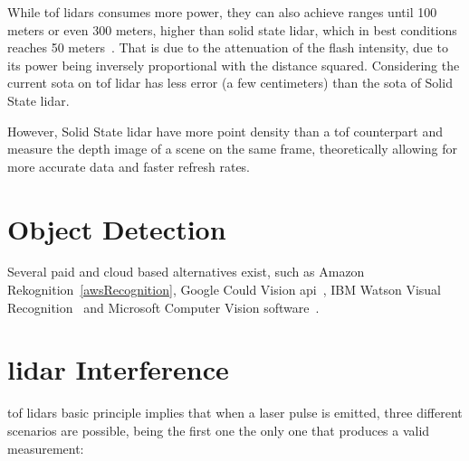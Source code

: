 While \ac{tof} \acp{lidar} consumes more power, they can also achieve ranges until 100 meters \cite{vlp16, Sullivan2016} or even 300 meters\citeneeded, higher than solid state \ac{lidar}, which in best conditions reaches 50 meters~\citeneeded. That is due to the attenuation of the flash intensity, due to its power being inversely proportional with the distance squared\citeneeded. Considering the current \ac{sota} on \ac{tof} \ac{lidar} has less error (a few centimeters) than the \ac{sota} of Solid State \ac{lidar}.

However, Solid State \ac{lidar} have more point density than a \ac{tof} counterpart and measure the depth image of a scene on the same frame, theoretically allowing for more accurate data and faster refresh rates\citeneeded. 





\section{Object Detection}
Several paid and cloud based alternatives exist, such as Amazon Rekognition~\ref{awsRecognition}, Google Could Vision \ac{api}~\cite{googlevision}, IBM Watson Visual Recognition~\cite{watson} and Microsoft Computer Vision software~\cite{azurecv}. 




\section{\ac{lidar} Interference}
\ac{tof} \ac{lidar}s basic principle implies that when a \ac{laser} pulse is emitted, three different scenarios are possible, being the first one the only one that produces a valid measurement:

